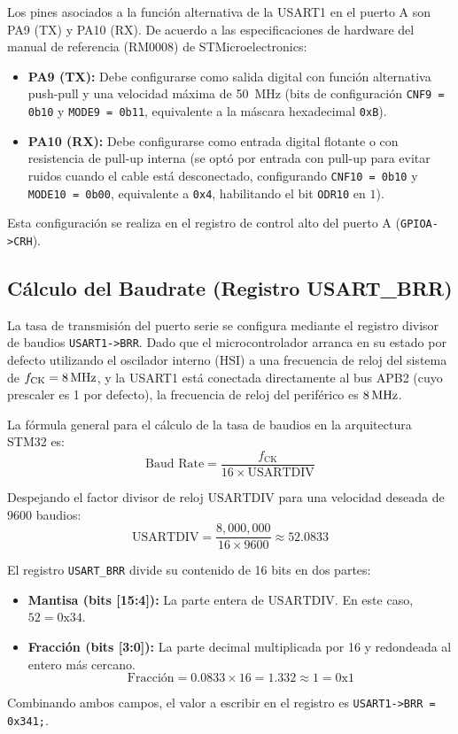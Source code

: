 Los pines asociados a la función alternativa de la USART1 en el puerto A son PA9 (TX) y PA10 (RX). De acuerdo a las
especificaciones de hardware del manual de referencia (RM0008) de STMicroelectronics:
\begin{itemize}
  \item \textbf{PA9 (TX):} Debe configurarse como salida digital con función alternativa push-pull y una velocidad
        máxima de \qty{50}{\MHz} (bits de configuración \lstinline{CNF9 = 0b10} y \lstinline{MODE9 = 0b11}, equivalente a la máscara hexadecimal \lstinline{0xB}).
  \item \textbf{PA10 (RX):} Debe configurarse como entrada digital flotante o con resistencia de pull-up interna
        (se optó por entrada con pull-up para evitar ruidos cuando el cable está desconectado, configurando
        \lstinline{CNF10 = 0b10} y \lstinline{MODE10 = 0b00}, equivalente a \lstinline{0x4}, habilitando el bit \lstinline{ODR10} en $1$).
\end{itemize}
Esta configuración se realiza en el registro de control alto del puerto A (\lstinline{GPIOA->CRH}).

\subsection{Cálculo del Baudrate (Registro USART\_BRR)}
La tasa de transmisión del puerto serie se configura mediante el registro divisor de baudios \lstinline{USART1->BRR}.
Dado que el microcontrolador arranca en su estado por defecto utilizando el oscilador interno (HSI) a una frecuencia de
reloj del sistema de $f_{\text{CK}} = 8\,\mathrm{MHz}$, y la USART1 está conectada directamente al bus APB2 (cuyo prescaler es
1 por defecto), la frecuencia de reloj del periférico es $8\,\mathrm{MHz}$.

La fórmula general para el cálculo de la tasa de baudios en la arquitectura STM32 es:
\begin{equation}
  \text{Baud Rate} = \frac{f_{\text{CK}}}{16 \times \text{USARTDIV}}
\end{equation}

Despejando el factor divisor de reloj $\text{USARTDIV}$ para una velocidad deseada de $9600$ baudios:
\begin{equation}
  \text{USARTDIV} = \frac{8,000,000}{16 \times 9600} \approx 52.0833
\end{equation}

El registro \lstinline{USART_BRR} divide su contenido de 16 bits en dos partes:
\begin{itemize}
  \item \textbf{Mantisa (bits [15:4]):} La parte entera de $\text{USARTDIV}$. En este caso, $52 = \text{0x34}$.
  \item \textbf{Fracción (bits [3:0]):} La parte decimal multiplicada por 16 y redondeada al entero más cercano.
        \begin{equation}
          \text{Fracción} = 0.0833 \times 16 = 1.332 \approx 1 = \text{0x1}
        \end{equation}
\end{itemize}
Combinando ambos campos, el valor a escribir en el registro es \lstinline{USART1->BRR = 0x341;}.

